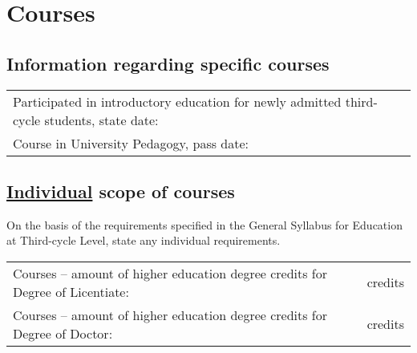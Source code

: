 \section{Courses}
\subsection{Information regarding specific courses}
\begin{tabular}{p{12cm}p{3cm}}
Participated in introductory education for newly admitted third-cycle students, state date: 
&\cellcolor[gray]{0.95}           \\
Course in University Pedagogy, pass date: 
&\cellcolor[gray]{0.95}           \\
\end{tabular}

\subsection{\underline{Individual} scope of courses}
On the basis of the requirements specified in the General Syllabus for Education at Third-cycle Level, state any individual requirements.

\begin{tabular}{p{12cm}p{3cm}}
{\small Courses -- amount of higher education degree credits for Degree of Licentiate:}
&\cellcolor[gray]{0.95}           \hfill \small credits\\
{\small Courses -- amount of higher education degree credits for Degree of Doctor:}
&\cellcolor[gray]{0.95}           \hfill \small credits\\
\end{tabular}

